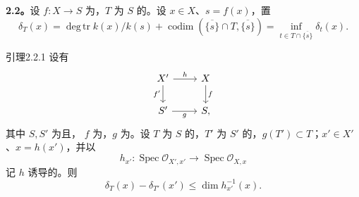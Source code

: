 \textbf{2.2。}设 $f:X\to S$ 为，$T$ 为 $S$ 的。设 $x\in X$、$s=f(x)$，置
\[\delta_T(x)=\operatorname{deg\,tr}k(x)/k(s)+\operatorname{codim}(\overline{\{s\}}\cap T,\overline{\{s\}})=\inf_{t\in T\cap\overline{\{s\}}}\delta_t(x).\]
\begin{SGAresult}{引理}{2.2.1}
设有
\[\begin{tikzcd}X'\arrow[r,"h"]\arrow[d,"f'"']&X\arrow[d,"f"]\\S'\arrow[r,"g"']&S,\end{tikzcd}\]
其中 $S,S'$ 为且， $f$ 为，$g$ 为。设 $T$ 为 $S$ 的，$T'$ 为 $S'$ 的，$g(T')\subset T$；$x'\in X'$、$x=h(x')$，并以
\[h_{x'}:\operatorname{Spec}\mathcal O_{X',x'}\longrightarrow\operatorname{Spec}\mathcal O_{X,x}\]
记 $h$ 诱导的。则
\[\delta_T(x)-\delta_{T'}(x')\leq\dim h_{x'}^{-1}(x).\]
\end{SGAresult}
